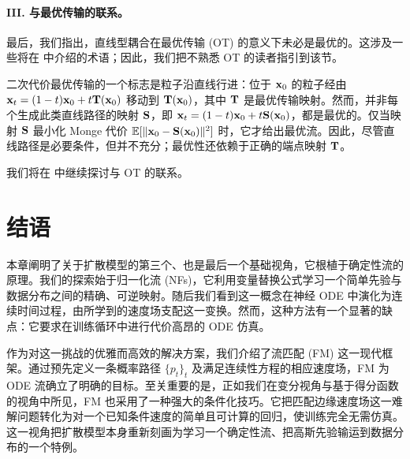 \paragraph{III. 与最优传输的联系。}
最后，我们指出，直线型耦合在最优传输 (OT) 的意义下未必是最优的。这涉及一些将在  中介绍的术语；因此，我们把不熟悉 OT 的读者指引到该节。

二次代价最优传输的一个标志是粒子沿直线行进：位于 ${\mathbf{x}}_0$ 的粒子经由 ${\mathbf{x}}_t = (1 - t){\mathbf{x}}_0 + t {\mathbf{T}}({\mathbf{x}}_0)$ 移动到 ${\mathbf{T}}({\mathbf{x}}_0)$，其中 ${\mathbf{T}}$ 是最优传输映射。然而，并非每个生成此类直线路径的映射 ${\mathbf{S}}$，即 ${\mathbf{x}}_t = (1 - t){\mathbf{x}}_0 + t {\mathbf{S}}({\mathbf{x}}_0)$，都是最优的。仅当映射 ${\mathbf{S}}$ 最小化 Monge 代价 $\mathbb{E}[\|{\mathbf{x}}_0 - {\mathbf{S}}({\mathbf{x}}_0)\|^2]$ 时，它才给出最优流。因此，尽管直线路径是必要条件，但并不充分；最优性还依赖于正确的端点映射 ${\mathbf{T}}$。


我们将在  中继续探讨与 OT 的联系。

\clearpage
\newpage

\newpage
\section{结语}\label{sec:ch5_cr}
      
本章阐明了关于扩散模型的第三个、也是最后一个基础视角，它根植于确定性流的原理。我们的探索始于归一化流 (NFs)，它利用变量替换公式学习一个简单先验与数据分布之间的精确、可逆映射。随后我们看到这一概念在神经 ODE 中演化为连续时间过程，由所学到的速度场支配这一变换。然而，这种方法有一个显著的缺点：它要求在训练循环中进行代价高昂的 ODE 仿真。




作为对这一挑战的优雅而高效的解决方案，我们介绍了流匹配 (FM) 这一现代框架。通过预先定义一条概率路径 $\{p_{t}\}_t$ 及满足连续性方程的相应速度场，FM 为 ODE 流确立了明确的目标。至关重要的是，正如我们在变分视角与基于得分函数的视角中所见，FM 也采用了一种强大的条件化技巧。它把匹配边缘速度场这一难解问题转化为对一个已知条件速度的简单且可计算的回归，使训练完全无需仿真。这一视角把扩散模型本身重新刻画为学习一个确定性流、把高斯先验输运到数据分布的一个特例。






